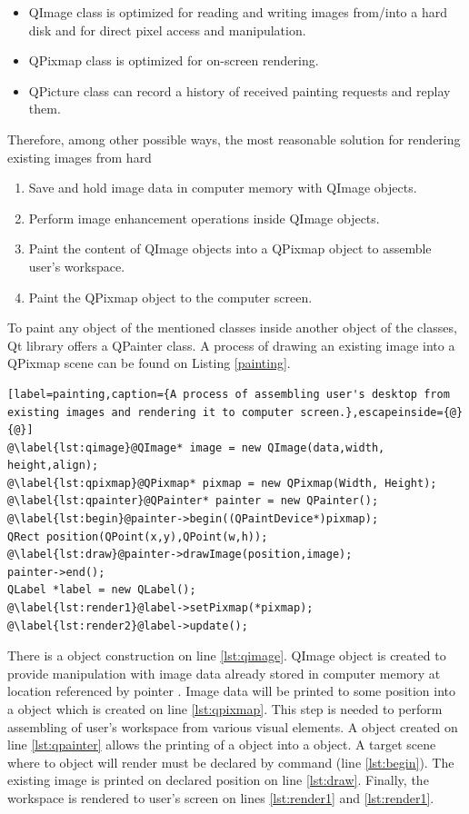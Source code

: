 \begin{itemize}
\item QImage class is optimized for reading and writing images from/into a hard disk and for direct pixel access and manipulation.
\item QPixmap class is optimized for on-screen rendering.
\item QPicture class can record a history of received painting requests and replay them.
\end{itemize}

Therefore, among other possible ways, the most reasonable solution for rendering existing images from hard

\begin{enumerate}
  \item Save and hold image data in computer memory with QImage objects.
  \item Perform image enhancement operations inside QImage objects.
  \item Paint the content of QImage objects into a QPixmap object to assemble user's workspace.
  \item Paint the QPixmap object to the computer screen.
\end{enumerate}

To paint any object of the mentioned classes inside another object of the classes, Qt library offers a QPainter class. A process of drawing an existing image into a QPixmap scene can be found on Listing \ref{painting}.

\begin{lstlisting}[label=painting,caption={A process of assembling user's desktop from existing images and rendering it to computer screen.},escapeinside={@}{@}]
@\label{lst:qimage}@QImage* image = new QImage(data,width, height,align);
@\label{lst:qpixmap}@QPixmap* pixmap = new QPixmap(Width, Height);
@\label{lst:qpainter}@QPainter* painter = new QPainter();
@\label{lst:begin}@painter->begin((QPaintDevice*)pixmap);
QRect position(QPoint(x,y),QPoint(w,h));
@\label{lst:draw}@painter->drawImage(position,image);
painter->end();
QLabel *label = new QLabel();
@\label{lst:render1}@label->setPixmap(*pixmap);
@\label{lst:render2}@label->update();
\end{lstlisting}

There is a  object construction on line \ref{lst:qimage}. QImage object is created to provide manipulation with image data already stored in computer memory at location referenced by pointer . Image data will be printed to some position into a  object which is created on line \ref{lst:qpixmap}. This step is needed to perform assembling of user's workspace from various visual elements. A  object created on line \ref{lst:qpainter} allows the printing of a  object into a  object. A target scene where to  object will render must be declared by  command (line \ref{lst:begin}). The existing image is printed on declared position on line \ref{lst:draw}. Finally, the workspace is rendered to user's screen on lines \ref{lst:render1} and \ref{lst:render1}.




